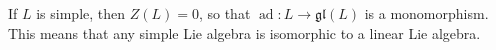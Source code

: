 If $L$ is simple, then $Z(L) = 0$, so that $\operatorname{ad}: L \rightarrow \mathfrak{gl}(L)$ is a monomorphism. This means that any simple Lie algebra is isomorphic to a linear Lie algebra.
